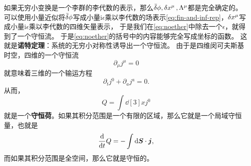 \documentclass[UTF8, a4paper]{ctexart}
\newcommand*{\ii}{\mathrm{i}}
\begin{document}
如果无穷小变换是一个李群的李代数的表示，那么$\bar{\var}{\phi},\var{x^\mu}, \Lambda^\mu$都是完全确定的。可以使用小量近似将$\bar{\var}{\phi}$写成小量$ \ii \epsilon$乘以李代数的场表示\eqref{eq:fin-and-inf-rep}，$\var{x^\mu}$写成小量$\ii \epsilon$乘以李代数的四维矢量表示，
于是我们在\eqref{eq:noether}中除去一个$\epsilon$，就得到了一个守恒流。
于是\eqref{eq:noether}的括号中的内容能够完全写成坐标的函数。
这就是\textbf{诺特定理}：系统的无穷小对称性诱导出一个守恒流。
由于是四维闵可夫斯基时空，四维的一个守恒流
\begin{equation}
    \partial_\mu j^\mu = 0
\end{equation}
就意味着三维的一个输运方程
\begin{equation}
    \partial_t j^0 + \partial_a j^a = 0.
\end{equation}
从而，
\begin{equation}
    Q = \int \dd[3]x j^0
\end{equation}
就是一个\textbf{守恒荷}。如果其积分范围是一个有限的区域，那么它就是一个局域守恒量，也就是
\[
    \dv{t} Q = - \int \dd{\vb*{S}} \cdot \vb*{j},
\]
而如果其积分范围是全空间，那么它就是守恒的。
\end{document}
